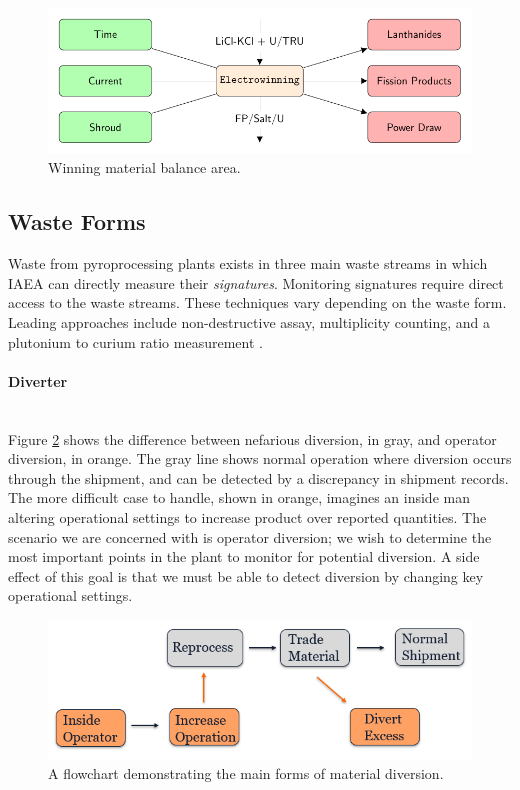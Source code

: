 \begin{figure}[h] 
	\centering
	\includegraphics[width=0.8\linewidth]{images/winning}
	\caption{Winning material balance area.}
	\label{fig:winning}
\end{figure}

\subsection{Waste Forms}

Waste from pyroprocessing plants exists in three main waste streams in which IAEA can directly measure their \emph{signatures}. Monitoring signatures require direct access to the waste streams.
These techniques vary depending on the waste form. Leading approaches include non-destructive assay, multiplicity counting, and a plutonium to curium ratio measurement \cite{lee_determination_2012,noauthor_non-destructive_nodate}.

\paragraph{Diverter} \mbox{}\\
Figure \ref{fig:diverttype} shows the difference between nefarious diversion, in gray, and operator diversion, in orange. The gray line shows normal operation where diversion occurs
through the shipment, and can be detected by a discrepancy in shipment records. The more difficult case to handle, shown in orange, imagines an inside man altering operational settings
to increase product over reported quantities. The scenario we are concerned with is operator diversion; we wish to determine the most important points in the plant to monitor for potential
diversion. A side effect of this goal is that we must be able to detect diversion by changing key operational settings.

\FloatBarrier

\begin{figure}[h]
	\centering
	\includegraphics[width=0.8\linewidth]{images/westphal-diversion}
	\caption{A flowchart demonstrating the main forms of material diversion.}
	\label{fig:diverttype}
\end{figure}

